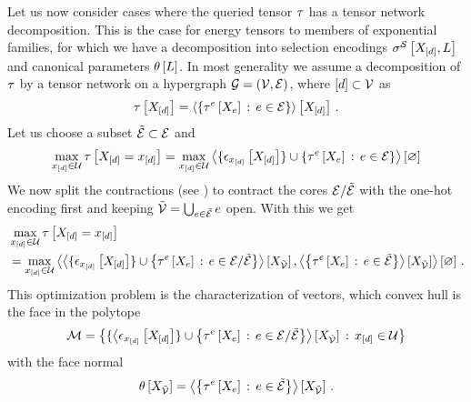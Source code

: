 \begin{example}
    Let us now consider cases where the queried tensor $\tau$ has a tensor network decomposition.
    This is the case for energy tensors to members of exponential families, for which we have a decomposition into selection encodings $\sigma^{\mathcal{S}}\left[X_{[d]},L\right]$ and canonical parameters $\theta\left[L\right]$.
    In most generality we assume a decomposition of $\tau$ by a tensor network on a hypergraph $\mathcal{G}=(\mathcal{V},\mathcal{E})$, where $[d]\subset\mathcal{V}$ as
    \begin{align*}
        \tau\left[X_{[d]}\right] = \left\langle \left\{\tau^{e}\left[X_{e}\right]\,:\,e\in\mathcal{E}\right\}\right\rangle \left[ X_{[d]} \right] \, .
    \end{align*}
    Let us choose a subset $\tilde{\mathcal{E}}\subset\mathcal{E}$ and
    \begin{align*}
        \max_{x_{[d]}\in\mathcal{U}} \tau\left[X_{[d]}=x_{[d]}\right]
        = \max_{x_{[d]}\in\mathcal{U}} \left\langle \{\epsilon_{x_{[d]}}\left[X_{[d]}\right]\} \cup \left\{\tau^{e}\left[X_{e}\right]\,:\,e\in\mathcal{E}\right\}\right\rangle \left[ \varnothing \right]
    \end{align*}
    We now split the contractions (see ) to contract the cores $\mathcal{E}/\tilde{\mathcal{E}}$ with the one-hot encoding first and keeping $\tilde{\mathcal{V}}=\bigcup_{e\in\tilde{\mathcal{E}}}e$ open.
    With this we get
    \begin{align*}
        & \max_{x_{[d]}\in\mathcal{U}} \tau\left[X_{[d]}=x_{[d]}\right] \\
        & = \max_{x_{[d]}\in\mathcal{U}}
        \left\langle 
            \left\langle \{\epsilon_{x_{[d]}}\left[X_{[d]}\right]\} \cup \left\{\tau^{e}\left[X_{e}\right]\,:\, e\in\mathcal{E}/\tilde{\mathcal{E}}\right\}\right\rangle \left[ X_{\tilde{\mathcal{V}}} \right],
            \left\langle \left\{\tau^{e}\left[X_{e}\right]\,:\, e\in\tilde{\mathcal{E}}\right\}\right\rangle \left[ X_{\tilde{\mathcal{V}}} \right]
        \right\rangle \left[ \varnothing \right] \, .
    \end{align*}
    This optimization problem is the characterization of vectors, which convex hull is the face in the polytope
    \begin{align*}
        \mathcal{M} = \left\{\{\left\langle \epsilon_{x_{[d]}}\left[X_{[d]}\right]\} \cup \left\{\tau^{e}\left[X_{e}\right]\,:\, e\in\mathcal{E}/\tilde{\mathcal{E}}\right\}\right\rangle \left[ X_{\tilde{\mathcal{V}}} \right] \,:\, x_{[d]}\in\mathcal{U} \right\}
    \end{align*}
    with the face normal
    \begin{align*}
        \theta\left[X_{\tilde{\mathcal{V}}}\right] =
        \left\langle \left\{\tau^{e}\left[X_{e}\right]\,:\, e\in\tilde{\mathcal{E}}\right\}\right\rangle \left[ X_{\tilde{\mathcal{V}}} \right] \, .
    \end{align*}
\end{example}


